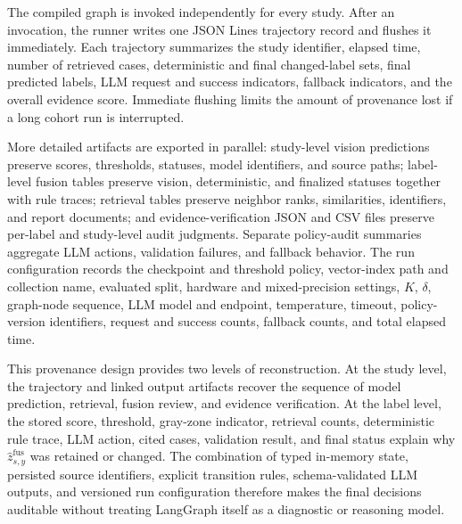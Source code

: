 The compiled graph is invoked independently for every study. After an invocation, the runner writes one JSON Lines trajectory record and flushes it immediately. Each trajectory summarizes the study identifier, elapsed time, number of retrieved cases, deterministic and final changed-label sets, final predicted labels, LLM request and success indicators, fallback indicators, and the overall evidence score. Immediate flushing limits the amount of provenance lost if a long cohort run is interrupted.

More detailed artifacts are exported in parallel: study-level vision predictions preserve scores, thresholds, statuses, model identifiers, and source paths; label-level fusion tables preserve vision, deterministic, and finalized statuses together with rule traces; retrieval tables preserve neighbor ranks, similarities, identifiers, and report documents; and evidence-verification JSON and CSV files preserve per-label and study-level audit judgments. Separate policy-audit summaries aggregate LLM actions, validation failures, and fallback behavior. The run configuration records the checkpoint and threshold policy, vector-index path and collection name, evaluated split, hardware and mixed-precision settings, $K$, $\delta$, graph-node sequence, LLM model and endpoint, temperature, timeout, policy-version identifiers, request and success counts, fallback counts, and total elapsed time.

This provenance design provides two levels of reconstruction. At the study level, the trajectory and linked output artifacts recover the sequence of model prediction, retrieval, fusion review, and evidence verification. At the label level, the stored score, threshold, gray-zone indicator, retrieval counts, deterministic rule trace, LLM action, cited cases, validation result, and final status explain why $\widehat z^{\mathrm{fus}}_{s,y}$ was retained or changed. The combination of typed in-memory state, persisted source identifiers, explicit transition rules, schema-validated LLM outputs, and versioned run configuration therefore makes the final decisions auditable without treating LangGraph itself as a diagnostic or reasoning model.
